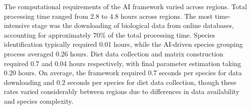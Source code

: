 The computational requirements of the AI framework varied across regions. Total processing time ranged from 2.8 to 4.8 hours across regions. The most time-intensive stage was the downloading of biological data from online databases, accounting for approximately 70\% of the total processing time. Species identification typically required 0.01 hours, while the AI-driven species grouping process averaged 0.26 hours. Diet data collection and matrix construction required 0.7 and 0.04 hours respectively, with final parameter estimation taking 0.20 hours. On average, the framework required 0.7 seconds per species for data downloading and 0.2 seconds per species for diet data collection, though these rates varied considerably between regions due to differences in data availability and species complexity.